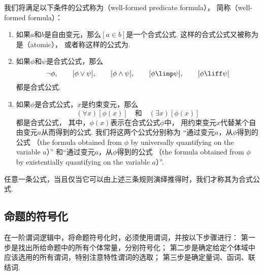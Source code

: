 我们将满足以下条件的公式称为（well-formed predicate formula），
简称（well-formed formula）：
\begin{enumerate}
	\item 如果\(a\)和\(b\)是自由变元，那么\([a \in b]\)是一个合式公式.
	这样的合式公式又被称为是（atomic），
	或者称这样的公式为.

	\item 如果\(\phi\)和\(\psi\)是合式公式，那么\begin{equation*}
		\neg \phi, \qquad
		[\phi \lor \psi], \qquad
		[\phi \land \psi], \qquad
		[\phi \limp \psi], \qquad
		[\phi \liff \psi]
	\end{equation*}
	都是合式公式.

	\item 如果\(\phi\)是合式公式，\(x\)是约束变元，那么\begin{equation*}
		(\forall x)[\phi(x)]
		\quad\text{和}\quad
		(\exists x)[\phi(x)]
	\end{equation*}
	都是合式公式，
	其中，\(\phi(x)\)表示在合式公式\(\phi\)中，
	用约束变元\(x\)代替某个自由变元\(a\)从而得到的公式.
	我们将这两个公式分别称为
	“通过变元\(a\)，从\(\phi\)得到的公式
	（the formula obtained from \(\phi\) by universally quantifying on the variable \(a\)）”
	和“通过变元\(a\)，从\(\phi\)得到的公式
	（the formula obtained from \(\phi\) by existentially quantifying on the variable \(a\)）”.
\end{enumerate}
任意一条公式，当且仅当它可以由上述三条规则演绎推得时，我们才称其为合式公式.

\subsection{命题的符号化}
在一阶谓词逻辑中，将命题符号化时，必须使用谓词，并按以下步骤进行：
第一步是找出所给命题中的所有个体常量，分别符号化；
第二步是确定给定个体域中应该选用的所有谓词，特别注意特性谓词的选取；
第三步是确定量词、函词、联结词.

